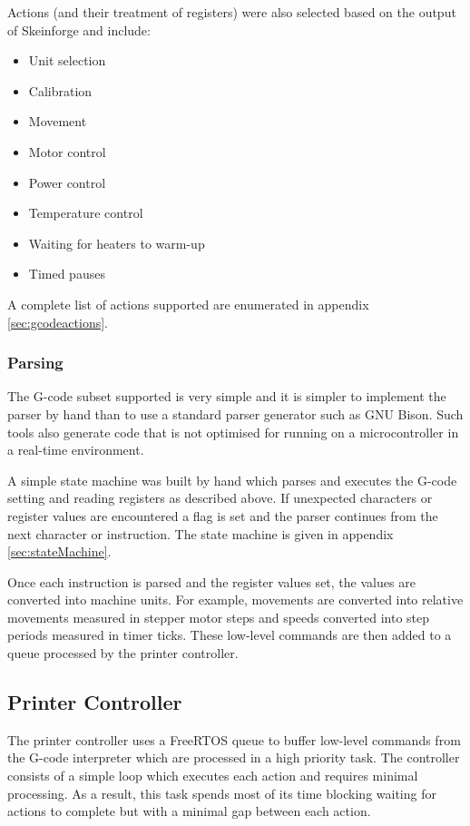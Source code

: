 				Actions (and their treatment of registers) were also selected based on the
				output of Skeinforge and include:
				\begin{itemize}
					\item Unit selection
					\item Calibration
					\item Movement
					\item Motor control
					\item Power control
					\item Temperature control
					\item Waiting for heaters to warm-up
					\item Timed pauses
				\end{itemize}
				A complete list of actions supported are enumerated in appendix
				\ref{sec:gcodeactions}.
			
			\subsubsection{Parsing}
				
				The G-code subset supported is very simple and it is simpler to
				implement the parser by hand than to use a standard parser generator
				such as GNU Bison. Such tools also generate code that is not optimised
				for running on a microcontroller in a real-time environment.
				
				A simple state machine was built by hand which parses and executes the
				G-code setting and reading registers as described above. If unexpected
				characters or register values are encountered a flag is set and the
				parser continues from the next character or instruction. The state
				machine is given in appendix \ref{sec:stateMachine}.
				
				Once each instruction is parsed and the register values set, the values
				are converted into machine units. For example, movements are converted
				into relative movements measured in stepper motor steps and speeds
				converted into step periods measured in timer ticks. These low-level
				commands are then added to a queue processed by the printer controller.
		
		\subsection{Printer Controller}
			
			The printer controller uses a FreeRTOS queue to buffer low-level commands
			from the G-code interpreter which are processed in a high priority task.
			The controller consists of a simple loop which executes each action and
			requires minimal processing. As a result, this task spends most of its
			time blocking waiting for actions to complete but with a minimal gap
			between each action.
		
